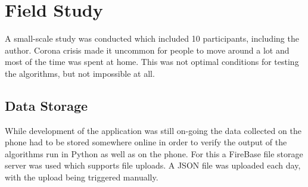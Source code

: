 \section{Field Study}
A small-scale study was conducted which included 10 participants, including the author. Corona crisis made it uncommon for people to move around a lot and most of the time was spent at home. This was not optimal conditions for testing the algorithms, but not impossible at all.

\subsection{Data Storage}
While development of the application was still on-going the data collected on the phone had to be stored somewhere online in order to verify the output of the algorithms run in Python as well as on the phone. For this a FireBase file storage server was used which supports file uploads. A JSON file was uploaded each day, with the upload being triggered manually. 


